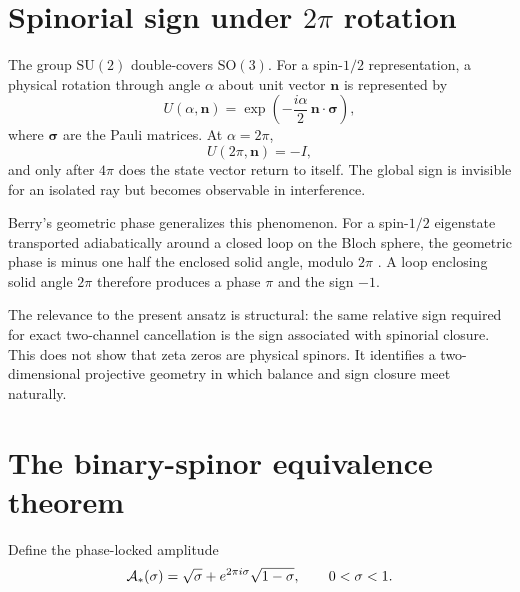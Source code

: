 \section{Spinorial sign under $2\pi$ rotation}

The group $\mathrm{SU}(2)$ double-covers $\mathrm{SO}(3)$. For a spin-$1/2$ representation, a physical rotation through angle $\alpha$ about unit vector $\mathbf n$ is represented by
\begin{equation}
 U(\alpha,\mathbf n)=\exp\!\left(-\frac{i\alpha}{2}\,\mathbf n\cdot\boldsymbol\sigma\right),
 \label{eq:spin-rotation}
\end{equation}
where $\boldsymbol\sigma$ are the Pauli matrices. At $\alpha=2\pi$,
\begin{equation}
 U(2\pi,\mathbf n)=-I,
 \label{eq:spinor-minus}
\end{equation}
and only after $4\pi$ does the state vector return to itself. The global sign is invisible for an isolated ray but becomes observable in interference.

Berry's geometric phase generalizes this phenomenon. For a spin-$1/2$ eigenstate transported adiabatically around a closed loop on the Bloch sphere, the geometric phase is minus one half the enclosed solid angle, modulo $2\pi$ \citep{berry1984}. A loop enclosing solid angle $2\pi$ therefore produces a phase $\pi$ and the sign $-1$.

The relevance to the present ansatz is structural: the same relative sign required for exact two-channel cancellation is the sign associated with spinorial closure. This does not show that zeta zeros are physical spinors. It identifies a two-dimensional projective geometry in which balance and sign closure meet naturally.

\section{The binary-spinor equivalence theorem}

Define the phase-locked amplitude
\begin{equation}
 \mathcal{A}_*(\sigma)
 =\sqrt\sigma+e^{2\pi i\sigma}\sqrt{1-\sigma},
 \qquad 0<\sigma<1.
 \label{eq:phase-locked-amplitude}
\end{equation}

